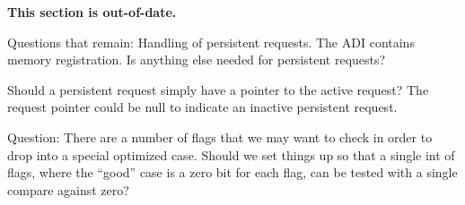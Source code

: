\documentclass{article}
\begin{document}
\textbf{This section is out-of-date.}

Questions that remain:  Handling of persistent requests.  The ADI
contains memory registration.  Is anything else needed for persistent
requests? 

Should a persistent request simply have a pointer to the active request?  The
request pointer could be null to indicate an inactive persistent request.

Question:  There are a number of flags that we may want to check in order to
drop into a special optimized case.  Should we set things up so that a single
int of flags, where the ``good'' case is a zero bit for each flag, can be
tested with a single compare against zero?



\end{document}
